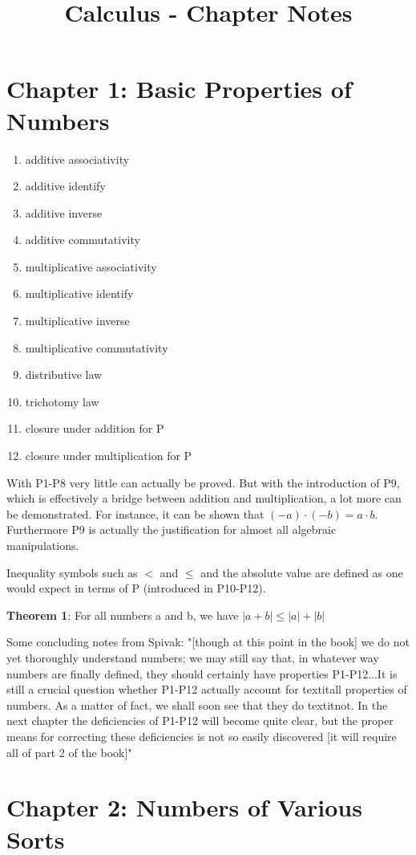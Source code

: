 \documentclass{article}
\begin{document}
\title{Calculus - Chapter Notes}
\author{}
\date{}
\maketitle

\section{Chapter 1: Basic Properties of Numbers}

\begin{enumerate}
	\item additive associativity
	\item additive identify
	\item additive inverse
	\item additive commutativity
	\item multiplicative associativity
	\item multiplicative identify
	\item multiplicative inverse
	\item multiplicative commutativity
	\item distributive law
	\item trichotomy law
	\item closure under addition for P
	\item closure under multiplication for P
\end{enumerate}

\begin{flushleft}
With P1-P8 very little can actually be proved. But with the introduction of P9, which is effectively a bridge between addition and multiplication, a lot more can be demonstrated. For instance, it can be shown that $(-a) \cdot (-b) = a \cdot b$. Furthermore P9 is actually the justification for almost all algebraic manipulations.
\end{flushleft}

\begin{flushleft}
Inequality symbols such as $<$ and $\leq$ and the absolute value are defined as one would expect in terms of P (introduced in P10-P12).
\end{flushleft}

\textbf{Theorem 1}: For all numbers a and b, we have $ |a+b| \leq |a|+|b| $

\begin{flushleft}
Some concluding notes from Spivak: "[though at this point in the book] we do not yet thoroughly understand numbers; we may still say that, in whatever way numbers are finally defined, they should certainly have properties P1-P12...It is still a crucial question whether P1-P12 actually account for textit{all} properties of numbers. As a matter of fact, we shall soon see that they do textit{not}. In the next chapter the deficiencies of P1-P12 will become quite clear, but the proper means for correcting these deficiencies is not so easily discovered [it will require all of part 2 of the book]"
\end{flushleft}

\section{Chapter 2: Numbers of Various Sorts}
\end{document}
